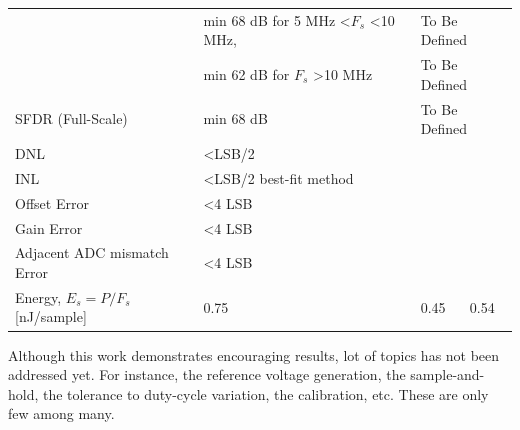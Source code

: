\begin{table}[htp]
\begin{tabular}{llll}
		\rowcolor{white}                      & min 68 dB for 5 MHz \textless $F_s$  \textless 10 MHz, & \multicolumn{2}{1}{To Be Defined}\\
		\rowcolor{white}						& min 62 dB for $F_s$  \textgreater 10 MHz & \multicolumn{2}{1}{To Be Defined} \\
		SFDR (Full-Scale)                & min 68 dB & \multicolumn{2}{1}{To Be Defined}                                                                                             \\
		DNL                              & \textless LSB/2 & &                                                                                      \\
		INL                              & \textless LSB/2 best-fit method & &                                                                                  \\
		Offset Error                     & \textless 4 LSB   & &                                                                                                                                           \\
		Gain Error                       & \textless 4 LSB   & &                                                                                                                                         \\
		Adjacent ADC mismatch Error      & \textless 4 LSB   & &                                                                                                                                          \\
		Energy, $E_s = P/F_s$ [nJ/sample] & 0.75  & 0.45 & 0.54   \\ \bottomrule                                                                                                                                       
	\end{tabular}
\end{table}

Although this work demonstrates encouraging results, lot of topics has not been addressed yet. For instance, the reference voltage generation, the sample-and-hold, the tolerance to duty-cycle variation, the calibration, etc. These are only few among many.